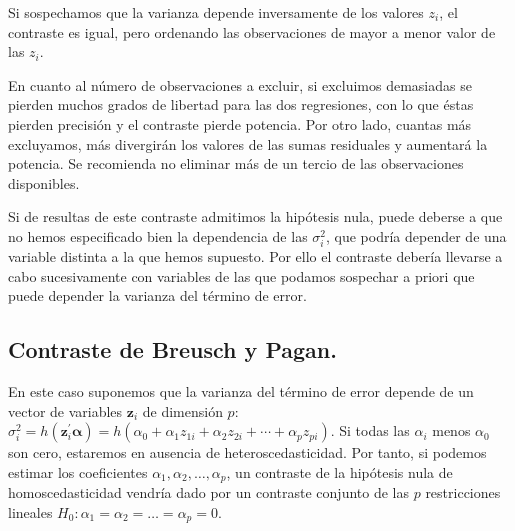 Si sospechamos que la varianza depende inversamente de los valores
$z_{i}$, el contraste es igual, pero ordenando las observaciones
de mayor a menor valor de las $z_{i}$.

En cuanto al n\'umero de observaciones a excluir, si excluimos demasiadas
se pierden muchos grados de libertad para las dos regresiones, con
lo que \'estas pierden precisi\'on y el contraste pierde potencia. Por
otro lado, cuantas m\'as excluyamos, m\'as divergir\'an los valores de las
sumas residuales y aumentar\'a la potencia. Se recomienda no eliminar
m\'as de un tercio de las observaciones disponibles.

Si de resultas de este contraste admitimos la hip\'otesis nula, puede
deberse a que no hemos especificado bien la dependencia de las $\sigma_{i}^{2}$,
que podr\'ia depender de una variable distinta a la que hemos supuesto.
Por ello el contraste deber\'ia llevarse a cabo sucesivamente con variables
de las que podamos sospechar a priori que puede depender la varianza
del t\'ermino de error.


\subsection{Contraste de Breusch y Pagan.}

En este caso suponemos que la varianza del t\'ermino de error depende
de un vector de variables $\boldsymbol{z}_{i}$ de dimensi\'on $p$:
$\sigma_{i}^{2}=h\left(\boldsymbol{z}_{i}^{\prime}\boldsymbol{\alpha}\right)=h\left(\alpha_{0}+\alpha_{1}z_{1i}+\alpha_{2}z_{2i}+\cdots+\alpha_{p}z_{pi}\right)$.
Si todas las $\alpha_{i}$ menos $\alpha_{0}$ son cero, estaremos
en ausencia de heteroscedasticidad. Por tanto, si podemos estimar
los coeficientes $\alpha_{1},\alpha_{2},\ldots,\alpha_{p}$, un contraste
de la hip\'otesis nula de homoscedasticidad vendr\'ia dado por un contraste
conjunto de las $p$ restricciones lineales $H_{0}:\alpha_{1}=\alpha_{2}=\ldots=\alpha_{p}=0$.

